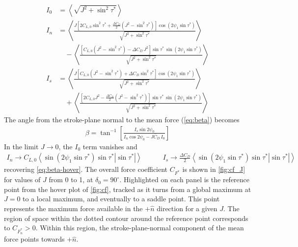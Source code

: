 \documentclass[11pt,letterpaper]{article}
\begin{document}
\begin{align}
    I_0 &= \left\langle \sqrt{J^2 + \sin^2\tau^*} \right\rangle \\
    I_n &= \left\langle \frac{J \left[ 2 C_{L,0} \sin^2\tau^* + \frac{\Delta C_D}{2} \left( J^2 - \sin^2\tau^* \right) \right] \cos\left( 2\psi_1 \sin\tau^* \right)}{\sqrt{J^2 + \sin^2\tau^*}} \right\rangle \nonumber \\
    &\quad - \left\langle \frac{\left[ C_{L,0} \left( J^2 - \sin^2\tau^* \right) - \Delta C_D\, J^2 \right] \sin\tau^*\, \sin\left( 2\psi_1 \sin\tau^* \right)}{\sqrt{J^2 + \sin^2\tau^*}} \right\rangle \\
    I_s &= \left\langle \frac{J \left[ C_{L,0} \left( J^2 - \sin^2\tau^* \right) + \Delta C_D \sin^2\tau^* \right] \cos\left( 2\psi_1 \sin\tau^* \right)}{\sqrt{J^2 + \sin^2\tau^*}} \right\rangle \nonumber \\
    &\quad + \left\langle \frac{\left[ 2 C_{L,0} J^2 - \frac{\Delta C_D}{2} \left( J^2 - \sin^2\tau^* \right) \right] \sin\tau^*\, \sin\left( 2\psi_1 \sin\tau^* \right)}{\sqrt{J^2 + \sin^2\tau^*}} \right\rangle
\end{align}
The angle from the stroke-plane normal to the mean force
(\autoref{eq:beta}) becomes
\begin{align}
    \beta = \tan^{-1} \left[ \frac{I_s \sin2\psi_0}{I_n \cos2\psi_0 - J \bar{C}_D\, I_0} \right] \label{eq:beta-general}
\end{align}
In the limit $J \to 0$, the $I_0$ term vanishes and
\begin{align}
    I_n \to C_{L,0} \left\langle \sin\left( 2\psi_1 \sin\tau^* \right) \sin\tau^* |\sin\tau^*| \right\rangle
    \quad\quad\quad
    I_s \to \frac{\Delta C_D}{2} \left\langle \sin\left( 2\psi_1 \sin\tau^* \right) \sin\tau^* |\sin\tau^*| \right\rangle
\end{align}
recovering \autoref{eq:beta-hover}. The overall force
coefficient $C_{F^*}$ is shown in \autoref{fig:cf_J}
for values of $J$ from 0 to 1, at $\delta_0 = 90^\circ$.
Highlighted on each panel
is the reference point from the hover plot of \autoref{fig:cf},
tracked as it turns from a global maximum at $J=0$ to a local
maximum, and eventually to a saddle point.
This point represents the maximum
force available in the $+\hat{n}$ direction for a given $J$.
The region of space within the dotted contour around
the reference point corresponds to $C_{F^*_n} > 0$.
Within this region, the stroke-plane-normal
component of the mean force points towards $+\hat{n}$.
\end{document}
